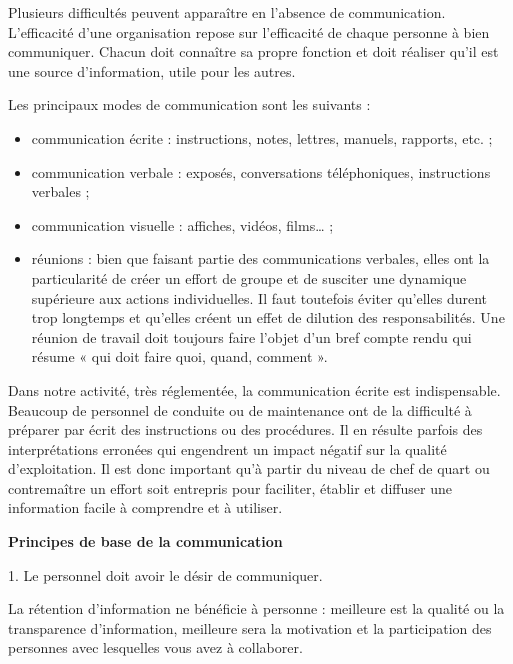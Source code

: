 Plusieurs difficultés peuvent apparaître en l’absence de communication. L’efficacité d’une organisation repose sur l’efficacité de chaque personne à bien communiquer. Chacun doit connaître sa propre fonction et doit réaliser qu’il est une source d’information, utile pour les autres.
\vspace{0.3cm} 

Les principaux modes de communication sont les suivants :

\begin{itemize}

\item communication écrite : instructions, notes, lettres, manuels, rapports, etc. ;
\item communication verbale : exposés, conversations téléphoniques, instructions verbales ;
\item communication visuelle : affiches, vidéos, films… ;
\item réunions : bien que faisant partie des communications verbales, elles ont la particularité de créer un effort de groupe et de susciter une dynamique supérieure aux actions individuelles. Il faut toutefois éviter qu’elles durent trop longtemps et qu’elles créent un effet de dilution des responsabilités. Une réunion de travail doit toujours faire l’objet d’un bref compte rendu qui résume « qui doit faire quoi, quand, comment ».
\end{itemize}

Dans notre activité, très réglementée, la communication écrite est indispensable. Beaucoup de personnel de conduite ou de maintenance ont de la difficulté à préparer par écrit des instructions ou des procédures. Il en résulte parfois des interprétations erronées qui engendrent un impact négatif sur la qualité d’exploitation. Il est donc important qu’à partir du niveau de chef de quart ou contremaître un effort soit entrepris pour faciliter, établir et diffuser une information facile à comprendre et à utiliser.



 \vspace{0.3cm}
\textbf{Principes de base de la communication}
 \vspace{0.3cm}

1. Le personnel doit avoir le désir de communiquer.
\vspace{0.3cm}

La rétention d’information ne bénéficie à personne : meilleure est la qualité ou la transparence d’information, meilleure sera la motivation et la participation des personnes avec lesquelles vous avez à collaborer.
\vspace{0.3cm} 

